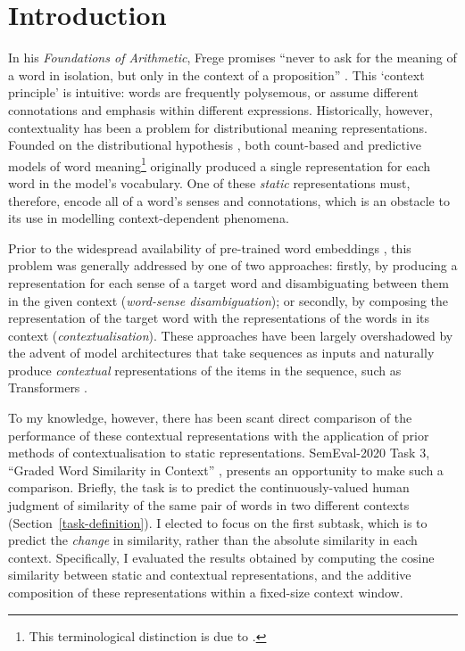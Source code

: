 
\section{Introduction}

In his \emph{Foundations of Arithmetic}, Frege promises ``never to ask for the meaning
of a word in isolation, but only in the context of a proposition''
\parencite*[xvii]{Frege1980}.
This `context principle' is intuitive: words are frequently polysemous, or assume
different connotations and emphasis within different expressions.
Historically, however, contextuality has been a problem for distributional meaning
representations.
Founded on the distributional hypothesis \parencites{Harris1954}{Firth1957}, both
count-based and predictive models of word meaning\footnote{ This terminological
  distinction is due to \textcite{Baroni2014a}.
} originally
produced a single representation for each word in the model's vocabulary.
One of these \emph{static} representations must, therefore, encode all of a word's
senses and connotations, which is an obstacle to its use in modelling context-dependent
phenomena.

Prior to the widespread availability of pre-trained word embeddings
\parencites[e.g.,][]{Mikolov2013}{Pennington2014}, this problem was generally addressed
by one of two approaches: firstly, by producing a representation for each sense of a
target word and disambiguating between them in the given context (\emph{word-sense
  disambiguation}); or secondly, by composing the representation of the target word with
the representations of the words in its context (\emph{contextualisation}).
These approaches have been largely overshadowed by the advent of model architectures
that take sequences as inputs and naturally produce \emph{contextual} representations
of the items in the sequence, such as Transformers \parencite{Vaswani2017}.

To my knowledge, however, there has been scant direct comparison of the performance of
these contextual representations with the application of prior methods of
contextualisation to static representations.
SemEval-2020 Task 3, ``Graded Word Similarity in Context''
\parencite{Armendariz2020a}, presents an opportunity to make such a comparison.
Briefly, the task is to predict the continuously-valued human judgment of similarity of
the same pair of words in two different contexts (Section~\ref{task-definition}).
I elected to focus on the first subtask, which is to predict the \emph{change} in
similarity, rather than the absolute similarity in each context.
Specifically, I evaluated the results obtained by computing the cosine similarity
between static and contextual representations, and the additive composition of these
representations within a fixed-size context window.

